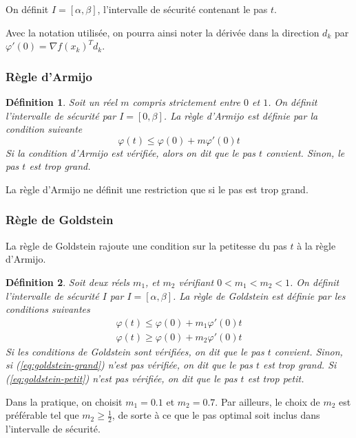 \documentclass[3p, twocolumn]{elsarticle}
\newtheorem{definition}{Définition}[section]
\begin{document}
On définit $I=[\alpha,\beta]$, l'intervalle de sécurité contenant le pas $t$.

\begin{rmk}
    Avec la notation utilisée, on pourra ainsi noter la dérivée dans la direction $d_k$ par $\varphi'(0)=\nabla f(x_k)^T d_k$.
\end{rmk}
\subsubsection{Règle d'Armijo}
\begin{definition}
    Soit un réel $m$ compris strictement entre $0$ et $1$. On définit l'intervalle de sécurité par $I=[0,\beta]$. La règle d'Armijo est définie par la condition suivante
    \begin{equation}
        \varphi(t) \leq \varphi(0) + m\varphi'(0)t
        \label{eq:armijo}
    \end{equation}
    Si la condition d'Armijo est vérifiée, alors on dit que le pas $t$ convient. Sinon, le pas $t$ est trop grand.
\end{definition}
La règle d'Armijo ne définit une restriction que si le pas est trop grand.

\subsubsection{Règle de Goldstein}
La règle de Goldstein rajoute une condition sur la petitesse du pas $t$ à la règle d'Armijo.
\begin{definition}
    Soit deux réels $m_1$, et $m_2$ vérifiant $0<m_1<m_2<1$. On définit l'intervalle de sécurité $I$ par $I=[\alpha,\beta]$. La règle de Goldstein est définie par les conditions suivantes
    \begin{align}
        \varphi(t) \leq \varphi(0) + m_1\varphi'(0)t
        \label{eq:goldstein-grand} \\
        \varphi(t) \geq \varphi(0) + m_2\varphi'(0)t
        \label{eq:goldstein-petit}
    \end{align}
    Si les conditions de Goldstein sont vérifiées, on dit que le pas $t$ convient. Sinon, si (\ref{eq:goldstein-grand}) n'est pas vérifiée, on dit que le pas $t$ est trop grand. Si (\ref{eq:goldstein-petit}) n'est pas vérifiée, on dit que le pas $t$ est trop petit.
\end{definition}
\begin{rmk}
    Dans la pratique, on choisit $m_1=0.1$ et $m_2 = 0.7$. Par ailleurs, le choix de $m_2$ est préférable tel que $m_2\geq \frac12$, de sorte à ce que le pas optimal soit inclus dans l'intervalle de sécurité.
\end{rmk}
\end{document}
